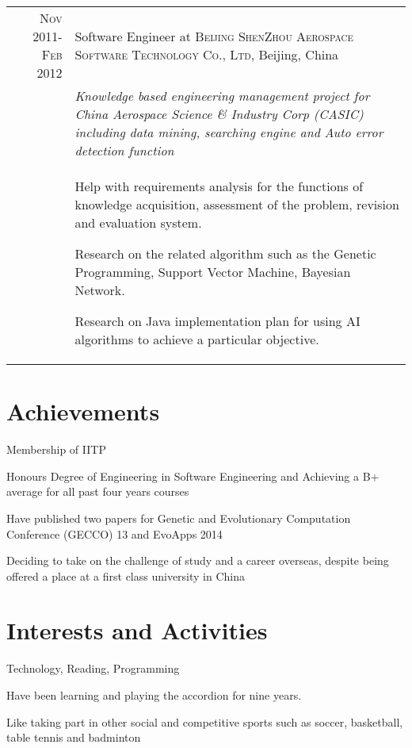 \documentclass[a4paper,10pt]{article} %
\begin{document}
\begin{tabular}{r|p{11cm}}
\textsc{Nov 2011-Feb 2012} & Software Engineer at \textsc{Beijing ShenZhou Aerospace Software Technology Co., Ltd}, Beijing, China \\
&\emph{Knowledge based engineering management project for China Aerospace Science \& Industry Corp (CASIC) including data mining, searching engine and Auto error detection function}\\
& \footnotesize{Help with requirements analysis for the functions of knowledge acquisition, assessment of the problem, revision and evaluation system.

Research on the related algorithm such as the Genetic Programming, Support Vector Machine, Bayesian Network.

Research on Java implementation plan for using AI algorithms to achieve a particular objective.
}
\end{tabular}



\section{Achievements}

Membership of IITP

Honours Degree of Engineering in Software Engineering and Achieving a B+ average for all past four years courses

Have published two papers for Genetic and Evolutionary Computation Conference (GECCO) 13 and EvoApps 2014

Deciding to take on the challenge of study and a career overseas, despite being offered a place at a first class university in China


\section{Interests and Activities}
Technology, Reading, Programming

Have been learning and playing the accordion for nine years.

Like taking part in other social and competitive sports such as soccer, basketball, table tennis and badminton
\end{document}
